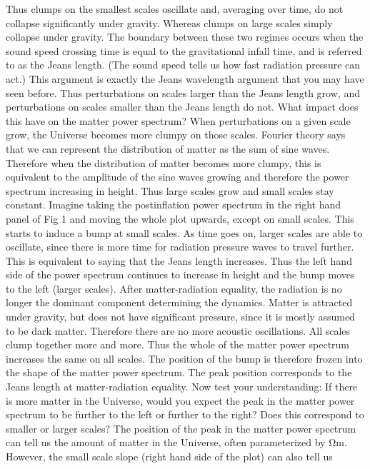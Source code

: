 Thus clumps on the smallest scales oscillate and, averaging over time, do not collapse significantly under
gravity. Whereas clumps on large scales simply collapse under gravity. The boundary between these two
regimes occurs when the sound speed crossing time is equal to the gravitational infall time, and is referred
to as the Jeans length. (The sound speed tells us how fast radiation pressure can act.) This argument is
exactly the Jeans wavelength argument that you may have seen before. Thus perturbations on scales
larger than the Jeans length grow, and perturbations on scales smaller than the Jeans length do not.
What impact does this have on the matter power spectrum? When perturbations on a given scale grow,
the Universe becomes more clumpy on those scales. Fourier theory says that we can represent the
distribution of matter as the sum of sine waves. Therefore when the distribution of matter becomes more
clumpy, this is equivalent to the amplitude of the sine waves growing and therefore the power spectrum
increasing in height. Thus large scales grow and small scales stay constant. Imagine taking the postinflation
power spectrum in the right hand panel of Fig 1 and moving the whole plot upwards, except on
small scales. This starts to induce a bump at small scales.
As time goes on, larger scales are able to oscillate, since there is more time for radiation pressure waves
to travel further. This is equivalent to saying that the Jeans length increases. Thus the left hand side of the
power spectrum continues to increase in height and the bump moves to the left (larger scales).
After matter-radiation equality, the radiation is no longer the dominant component determining the
dynamics. Matter is attracted under gravity, but does not have significant pressure, since it is mostly
assumed to be dark matter. Therefore there are no more acoustic oscillations. All scales clump together
more and more. Thus the whole of the matter power spectrum increases the same on all scales. The
position of the bump is therefore frozen into the shape of the matter power spectrum.
The peak position corresponds to the Jeans length at matter-radiation equality.
Now test your understanding: If there is more matter in the Universe, would you expect the peak in the
matter power spectrum to be further to the left or further to the right? Does this correspond to smaller or
larger scales?
The position of the peak in the matter power spectrum can tell us the amount of matter in the Universe,
often parameterized by Ωm. However, the small scale slope (right hand side of the plot) can also tell us

